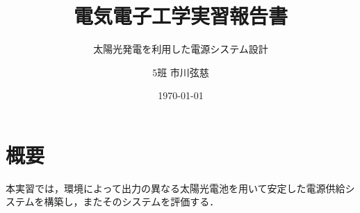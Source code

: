 




\usepackage{subfiles}
\usepackage{subcaption}

\captionsetup[subfigure]{labelformat=simple}
\renewcommand{\thesubfigure}{(\alph{subfigure})}

\graphicspath{{../figures/}}

\title{電気電子工学実習報告書}
\subtitle{太陽光発電を利用した電源システム設計}
\author{5班 市川弦慈}
\date{\today}




\maketitle
\thispagestyle{empty}

\newpage
\setcounter{page}{1}

\section{概要}

  本実習では，環境によって出力の異なる太陽光電池を用いて安定した電源供給システムを構築し，またそのシステムを評価する．


  
  \clearpage
  
  \clearpage
  
  \clearpage
  



